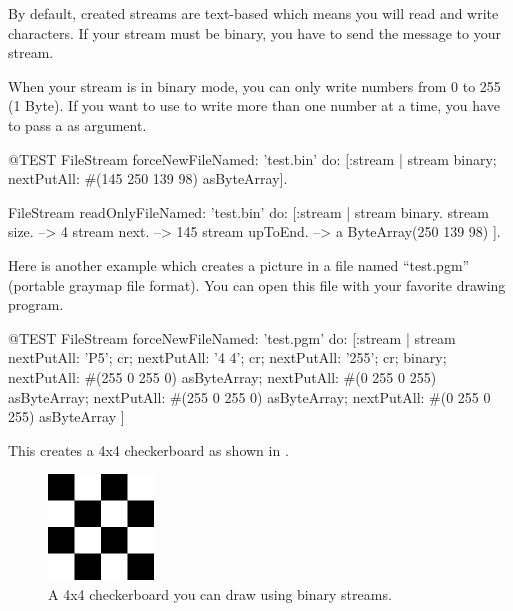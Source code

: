 \documentclass[a4paper,10pt,twoside]{book}
\begin{document}
By default, created streams are text-based which means you will read
and write characters. If your stream must be binary, you have to send
the message  to your stream.

When your stream is in binary mode, you can only write numbers from 0
to 255 (1 Byte). If you want to use  to write more
than one number at a time, you have to pass a  as
argument.

\begin{code}{@TEST}
FileStream
  forceNewFileNamed: 'test.bin'
  do: [:stream |
          stream
            binary;
            nextPutAll: #(145 250 139 98) asByteArray].

FileStream
  readOnlyFileNamed: 'test.bin'
  do: [:stream |
          stream binary.
          stream size.         --> 4
          stream next.         --> 145
          stream upToEnd. --> a ByteArray(250 139 98)
      ].
\end{code}

Here is another example which creates a picture in a file named
``test.pgm'' (portable graymap file format). You can open this file with your favorite drawing program.

\begin{code}{@TEST}
FileStream
  forceNewFileNamed: 'test.pgm' 
  do: [:stream |
	stream
		nextPutAll: 'P5'; cr;
		nextPutAll: '4 4'; cr;
		nextPutAll: '255'; cr;
		binary;
		nextPutAll: #(255 0 255 0) asByteArray;
		nextPutAll: #(0 255 0 255) asByteArray;
		nextPutAll: #(255 0 255 0) asByteArray;
		nextPutAll: #(0 255 0 255) asByteArray
	]
\end{code}

This creates a 4x4 checkerboard as shown in .

\begin{figure}[!ht]
\centerline{\includegraphics[width=0.25\textwidth]{checkerboard4x4}}
\caption{A 4x4 checkerboard you can draw using binary streams.}
\label{fig:checkerboard4x4}
\vspace{.2in}
\end{figure}
\end{document}
